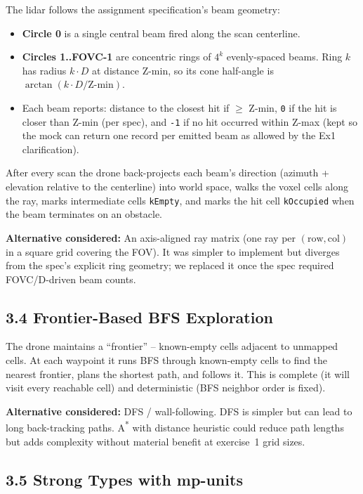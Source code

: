 \documentclass[12pt,a4paper]{article}
\begin{document}
The lidar follows the assignment specification's beam geometry:
\begin{itemize}[nosep]
\item \textbf{Circle 0} is a single central beam fired along the scan centerline.
\item \textbf{Circles 1..FOVC-1} are concentric rings of $4^k$ evenly-spaced
      beams. Ring $k$ has radius $k\cdot D$ at distance Z-min, so its cone
      half-angle is $\arctan(k\cdot D / \text{Z-min})$.
\item Each beam reports: distance to the closest hit if $\ge$ Z-min,
      \texttt{0} if the hit is closer than Z-min (per spec), and \texttt{-1}
      if no hit occurred within Z-max (kept so the mock can return one
      record per emitted beam as allowed by the Ex1 clarification).
\end{itemize}

After every scan the drone back-projects each beam's direction (azimuth +
elevation relative to the centerline) into world space, walks the voxel
cells along the ray, marks intermediate cells \texttt{kEmpty}, and marks
the hit cell \texttt{kOccupied} when the beam terminates on an obstacle.

\textbf{Alternative considered:} An axis-aligned ray matrix (one ray per
$(\text{row}, \text{col})$ in a square grid covering the FOV). It was simpler
to implement but diverges from the spec's explicit ring geometry; we replaced
it once the spec required FOVC/D-driven beam counts.

\subsection{3.4 Frontier-Based BFS Exploration}

The drone maintains a ``frontier'' -- known-empty cells adjacent to unmapped
cells. At each waypoint it runs BFS through known-empty cells to find the
nearest frontier, plans the shortest path, and follows it. This is complete
(it will visit every reachable cell) and deterministic (BFS neighbor order
is fixed).

\textbf{Alternative considered:} DFS / wall-following. DFS is simpler but can
lead to long back-tracking paths. A\textsuperscript{*} with distance heuristic
could reduce path lengths but adds complexity without material benefit at
exercise~1 grid sizes.

\subsection{3.5 Strong Types with mp-units}
\end{document}
